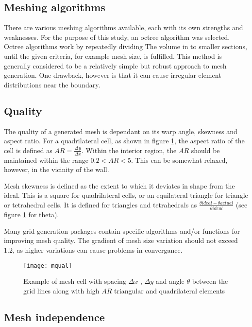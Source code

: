 \subsection{Meshing algorithms}
There are various meshing algorithms available, each with its own strengths and weaknesses. For the purpose of this study, an octree algorithm was selected. Octree algorithms work by repeatedly dividing The volume in to smaller sections, until the given criteria, for example mesh size, is fulfilled. This method is generally considered to be a relatively simple but robust approach to mesh generation. One drawback, however is that it can cause irregular element distributions near the boundary.

\subsection{Quality}

The quality of a generated mesh is dependant on its warp angle, skewness and aspect ratio. For a quadrilateral cell, as shown in figure \ref{fig:mqual}, the aspect ratio of the cell is defined as $AR = \frac{\Delta y} {\Delta x}$. Within the interior region, the $AR$ should be maintained within the range $0.2 < AR < 5$. This can be somewhat relaxed, however, in the vicinity of the wall.

Mesh skewness is defined as the extent to which it deviates in shape from the ideal. This is a square for quadrilateral cells, or an equilateral triangle for triangle or tetrahedral cells. It is defined for triangles and tetrahedrals as $\frac{\theta ideal - \theta actual} {\theta ideal}$ (see figure \ref{fig:mqual} for theta).

Many grid generation packages contain specific algorithms and/or functions for improving mesh quality. The gradient of mesh size variation should not exceed 1.2, as higher variations can cause problems in convergance.

\begin{figure}
  \texttt{[image: mqual]}
  \caption{Example of mesh cell with spacing $\Delta x$ , $\Delta y$ and angle $ \theta $ between the grid lines along with high $AR$ triangular and quadrilateral elements } \label{fig:mqual}
\end{figure}
 
\subsection{Mesh independence}

